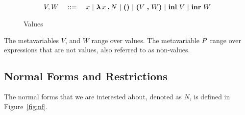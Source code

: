 \begin{figure*}[h]
\[\uncolored
\begin{array}[t]{@{}lll@{}}
V,W & \mathbin{\ ::=\ } & \expvar{x}\ |\ \expabs{x}{A}{N}\ |\ \expunt\ |\ \expprd{V}{W}\ |\ \explft{V}{B}\ |\ \exprgt{A}{W}
\end{array}
\]
\caption{Values}
\label{fig:val}
\end{figure*}

The metavariables $V$, and $W$ range over values. The metavariable
$P$ range over expressions that are not values, also referred to as non-values.

\subsection{Normal Forms and Restrictions}
The normal forms that we are interested about, denoted as $N$, is defined in Figure~\ref{fig:nf}.



